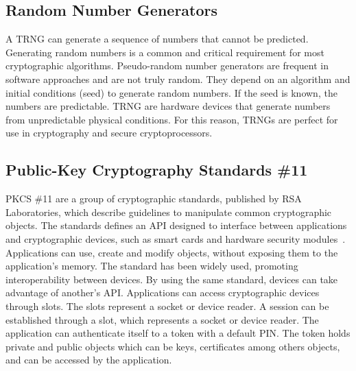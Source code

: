 

\subsection{Random Number Generators}
A \ac{TRNG} can generate a sequence of numbers that cannot be predicted. Generating random numbers is a common and critical requirement for most cryptographic algorithms. Pseudo-random number generators are frequent in software approaches and are not truly random. They depend on an algorithm and initial conditions (seed) to generate random numbers. If the seed is known, the numbers are predictable.
\ac{TRNG} are hardware devices that generate numbers from unpredictable physical conditions. For this reason, \ac{TRNG}s are perfect for use in cryptography and secure cryptoprocessors.

\subsection{Public-Key Cryptography Standards \#11}
\ac{PKCS} \#11 are a group of cryptographic standards, published by RSA Laboratories, which describe guidelines to manipulate common cryptographic objects.
The standards defines an \ac{API} designed to interface between applications and cryptographic devices, such as smart cards and hardware security modules~\cite{pkcs11analysis}. 
Applications can use, create and modify objects, without exposing them to the application's memory.
The standard has been widely used, promoting interoperability between devices. By using the same standard, devices can take advantage of another's \ac{API}.
Applications can access cryptographic devices through slots. The slots represent a socket or device reader. A session can be established through a slot, which represents a socket or device reader. The application can authenticate itself to a token with a default \ac{PIN}. The token holds private and public objects which can be keys, certificates among others objects, and can be accessed by the application.

